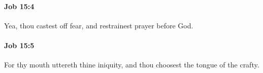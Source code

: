 		\paragraph{Job 15:4} %
			\label{JOB-15-4}

			Yea, thou castest off fear, and restrainest prayer before God.


		\paragraph{Job 15:5} %
			\label{JOB-15-5}

			For thy mouth uttereth thine iniquity, and thou choosest the tongue of the crafty.


